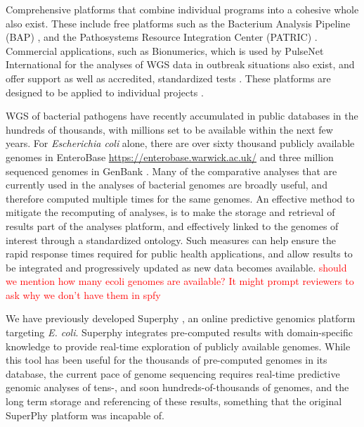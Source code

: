 \documentclass{article}
\newcommand\mwcomment[1]{\textcolor{red}{#1}}
\begin{document}
Comprehensive platforms that combine individual programs into a cohesive whole also exist. These include free platforms such as the Bacterium Analysis Pipeline (BAP) \cite{thomsen2016bacterial}, and the Pathosystems Resource Integration Center (PATRIC) \cite{wattam2016improvements}. Commercial applications, such as Bionumerics, which is used by PulseNet International for the analyses of WGS data in outbreak situations also exist, and offer support as well as accredited, standardized tests \cite{swaminathan2001pulsenet}. These platforms are designed to be applied to individual projects \cite{}.

WGS of bacterial pathogens have recently accumulated in public databases in the hundreds of thousands, with millions set to be available within the next few years. For \textit{Escherichia coli} alone, there are over sixty thousand publicly available genomes in EnteroBase \url{https://enterobase.warwick.ac.uk/} and three million sequenced genomes in GenBank \cite{doi:10.1093/nar/gks1195}. Many of the comparative analyses that are currently used in the analyses of bacterial genomes are broadly useful, and therefore computed multiple times for the same genomes. An effective method to mitigate the recomputing of analyses, is to make the storage and retrieval of results part of the analyses platform, and effectively linked to the genomes of interest through a standardized ontology. Such measures can help ensure the rapid response times required for public health applications, and allow results to be integrated and progressively updated as new data becomes available.
\mwcomment{should we mention how many ecoli genomes are available? It might prompt reviewers to ask why we don't have them in spfy}

We have previously developed Superphy \cite{whiteside2016superphy}, an online predictive genomics platform targeting \textit{E. coli}. Superphy integrates pre-computed results with domain-specific knowledge to provide real-time exploration of publicly available genomes. While this tool has been useful for the thousands of pre-computed genomes in its database, the current pace of genome sequencing requires real-time predictive genomic analyses of tens-, and soon hundreds-of-thousands of genomes, and the long term storage and referencing of these results, something that the original SuperPhy platform was incapable of.

\end{document}
